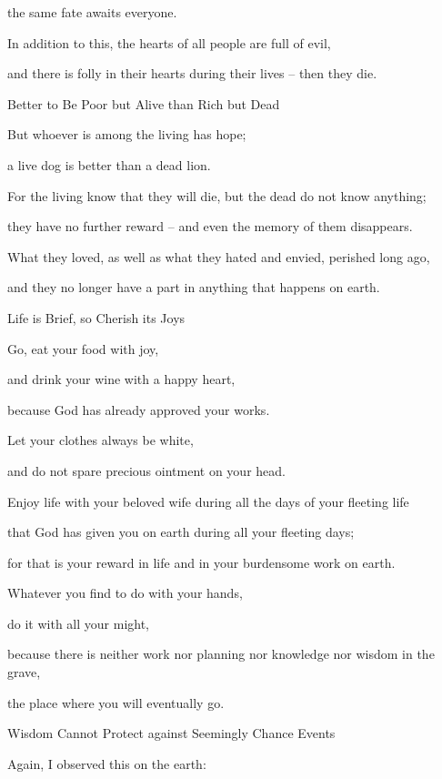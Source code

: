 {\par }{\Q the same
fate
awaits everyone.
\par }{\Q In addition to this, the hearts
of all people
are full
of evil,
\par }{\Q and there is folly
in their hearts
during their lives
– then they die.
\par }{\SH Better to Be Poor but Alive than Rich but Dead
\par }{\Q {}But
whoever
is among the living
has hope;
\par }{\Q a live
dog
is better
than
a dead
lion.
\par }{\Q {}For
the living
know
that they will die,
but the dead
do not
know
anything;
\par }{\Q they have no
further
reward
– and even the memory
of them disappears.
\par }{\Q {}What they loved,
as well as
what they hated
and envied,
perished
long ago,
\par }{\Q and they
no
longer
have a part
in anything
that
happens
on earth.
\par }{\SH Life is Brief, so Cherish its Joys
\par }{\Q {}Go,
eat
your food
with joy,
\par }{\Q and drink
your wine
with a happy
heart,
\par }{\Q because
God
has already
approved
your works.
\par }{\Q {}Let
your clothes
always
be
white,
\par }{\Q and do not
spare precious
ointment
on
your head.
\par }{\Q {}Enjoy
life
with
your beloved
wife
during all
the days
of your fleeting
life
\par }{\Q that God has
given
you on
earth
during all
your fleeting
days;
\par }{\Q for
that
is your reward
in life
and in your
burdensome work
on earth.
\par }{\Q {}Whatever
you find
to do
with your hands,
\par }{\Q do
it with all
your might,
\par }{\Q because
there is neither
work
nor planning
nor knowledge
nor wisdom
in the grave,
\par }{\Q the place where
you
will eventually go.
\par }{\SH Wisdom Cannot Protect against Seemingly Chance Events
\par }{\Q {}Again,
I observed
this on
the earth:

}
